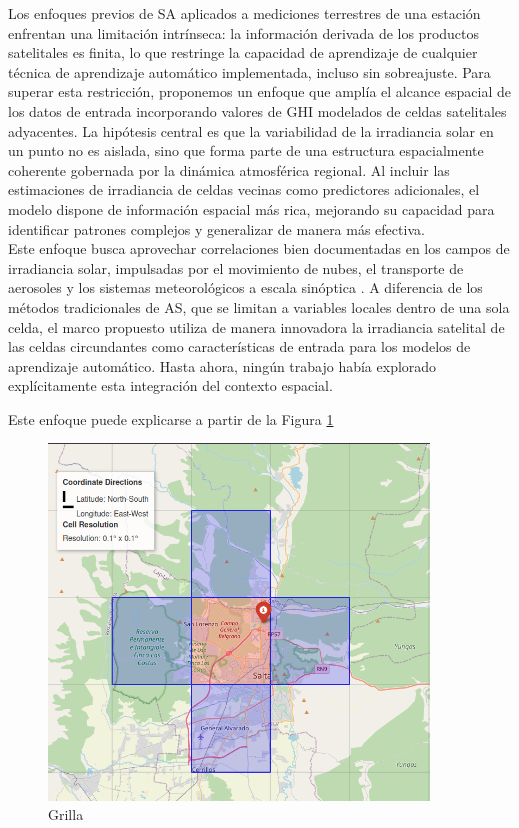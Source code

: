 Los enfoques previos de SA aplicados a mediciones terrestres de una estación enfrentan una limitación intrínseca: la información derivada de los productos satelitales es finita, lo que restringe la capacidad de aprendizaje de cualquier técnica de aprendizaje automático implementada, incluso sin sobreajuste. Para superar esta restricción, proponemos un enfoque que amplía el alcance espacial de los datos de entrada incorporando valores de GHI modelados de celdas satelitales adyacentes. La hipótesis central es que la variabilidad de la irradiancia solar en un punto no es aislada, sino que forma parte de una estructura espacialmente coherente gobernada por la dinámica atmosférica regional. Al incluir las estimaciones de irradiancia de celdas vecinas como predictores adicionales, el modelo dispone de información espacial más rica, mejorando su capacidad para identificar patrones complejos y generalizar de manera más efectiva.\\

Este enfoque busca aprovechar correlaciones bien documentadas en los campos de irradiancia solar, impulsadas por el movimiento de nubes, el transporte de aerosoles y los sistemas meteorológicos a escala sinóptica \citep{IHSAN2024}. A diferencia de los métodos tradicionales de AS, que se limitan a variables locales dentro de una sola celda, el marco propuesto utiliza de manera innovadora la irradiancia satelital de las celdas circundantes como características de entrada para los modelos de aprendizaje automático. Hasta ahora, ningún trabajo había explorado explícitamente esta integración del contexto espacial.



Este enfoque puede explicarse a partir de la Figura \ref{fig:gridSA}



\begin{figure}
    \centering
    \includegraphics[width=0.9\textwidth]{figuras/gridSA.png}
    \caption{Grilla }
    \label{fig:gridSA}
\end{figure}


